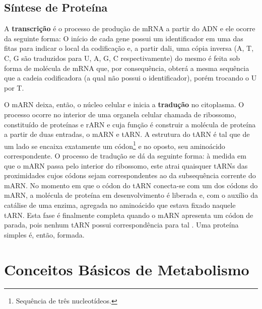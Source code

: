 
\subsection{Síntese de Proteína} \label{sinteseDeProteina}
\indent A \textbf{transcrição} é o processo de produção de mRNA a partir do ADN e ele ocorre da seguinte forma: O início de cada gene possui um identificador em uma das fitas para indicar o local da codificação e, a partir dali, uma cópia inversa (A, T, C, G são traduzidos para U, A, G, C respectivamente) do mesmo é feita sob forma de molécula de mRNA que, por consequência, obterá a mesma sequência que a cadeia codificadora (a qual não possui o identificador), porém trocando o U por T.

\indent O mARN deixa, então, o núcleo celular e inicia a \textbf{tradução} no citoplasma. O processo ocorre no interior de uma organela celular chamada de ribossomo, constituído de proteínas e rARN e cuja função é construir a molécula de proteína a partir de duas entradas, o mARN e tARN. A estrutura do tARN é tal que de um lado se encaixa exatamente um códon\footnote{Sequência de três nucleotídeos.} e no oposto, seu aminoácido correspondente. O processo de tradução se dá da seguinte forma: à medida em que o mARN passa pelo interior do ribossomo, este atrai quaisquer tARNs das proximidades cujos códons sejam correspondentes ao da subsequência corrente do mARN. No momento em que o códon do tARN conecta-se com um dos códons do mARN, a molécula de proteína em desenvolvimento é liberada e, com o auxílio da catálise de uma enzima, agregada no aminoácido que estava fixado naquele tARN. Esta fase é finalmente completa quando o mARN apresenta um códon de parada, pois nenhum tARN possui correspondência para tal \cite{setubal97}. Uma proteína simples é, então, formada.





\section{Conceitos Básicos de Metabolismo} \label{conceitosMeta}

